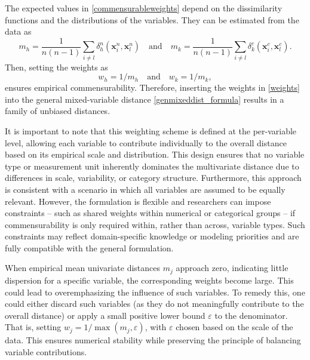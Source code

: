 \documentclass[12pt]{article}
\begin{document}
The expected values in \eqref{commensurableweights} depend on the dissimilarity functions and the distributions of the variables. They can be estimated from the data as
\begin{equation*}
m_{h} = \frac{1}{n(n-1)} \sum_{i \ne l} \delta^{n}_{h}(\mathbf{x}^{n}_{i}, \mathbf{x}^{n}_{l}) \quad \text{and} \quad m_{k} = \frac{1}{n(n-1)} \sum_{i \ne l} \delta^{c}_{k}(\mathbf{x}^{c}_{i}, \mathbf{x}^{c}_{l}).
\end{equation*}
Then, setting the weights as
\begin{equation}\label{weights}
w_{h} = 1/m_{h} \quad \text{and} \quad w_{k} = 1/m_{k},
\end{equation}
ensures empirical commensurability. Therefore, inserting the weights in \eqref{weights} into the general mixed-variable distance \eqref{genmixeddist_formula} results in a family of unbiased distances.

It is important to note that this weighting scheme is defined at the per-variable level, allowing each variable to contribute individually to the overall distance based on its empirical scale and distribution. This design ensures that no variable type or measurement unit inherently dominates the multivariate distance due to differences in scale, variability, or category structure. Furthermore, this approach is consistent with a scenario in which all variables are assumed to be equally relevant. However, the formulation is flexible and researchers can impose constraints -- such as shared weights within numerical or categorical groups -- if commensurability is only required within, rather than across, variable types. Such constraints may reflect domain-specific knowledge or modeling priorities and are fully compatible with the general formulation.

When empirical mean univariate distances $m_j$ approach zero, indicating little dispersion for a specific variable, the corresponding weights become large. This could lead to overemphasizing the influence of such variables. To remedy this, one could either discard such variables (as they do not meaningfully contribute to the overall distance) or apply a small positive lower bound $\varepsilon$ to the denominator. That is, setting $w_j = 1 / \max(m_j, \varepsilon)$, with $\varepsilon$ chosen based on the scale of the data. This ensures numerical stability while preserving the principle of balancing variable contributions.
\end{document}
